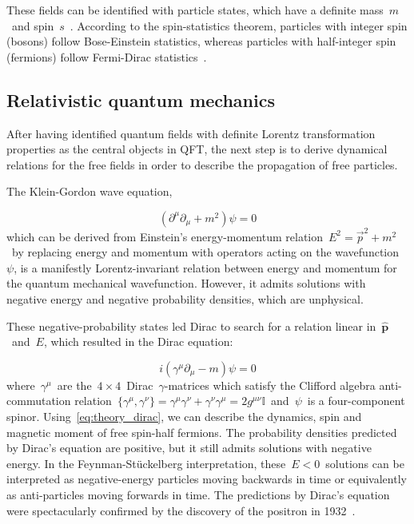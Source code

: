 These fields can be identified with particle states, which have a definite mass~$m$~and spin~$s$~\cite{wigner1939unitary}. According to the spin-statistics theorem, particles with integer spin (bosons) follow Bose-Einstein statistics, whereas particles with half-integer spin (fermions) follow Fermi-Dirac statistics~\cite{pauli1940connection}. 

\subsection{Relativistic quantum mechanics}
After having identified quantum fields with definite Lorentz transformation properties as the central objects in QFT, the next step is to derive dynamical relations for the free fields in order to describe the propagation of free particles.

The Klein-Gordon wave equation,

\begin{equation}
\label{eq:theory_klein_gordon}
(\partial^\mu \partial_\mu + m^2) \psi = 0
\end{equation}
which can be derived from Einstein's energy-momentum relation~$E^2 = \vec{p}^2 + m^2$~by replacing energy and momentum with operators acting on the wavefunction~$\psi$, is a manifestly Lorentz-invariant relation between energy and momentum for the quantum mechanical wavefunction. However, it admits solutions with negative energy and negative probability densities, which are unphysical.

These negative-probability states led Dirac to search for a relation linear in~$\hat{\mathbf{p}}$~and~$E$, which resulted in the Dirac equation:

\begin{equation}
\label{eq:theory_dirac}
i (\gamma^\mu \partial_\mu - m) \psi = 0
\end{equation}
where~$\gamma^\mu$~are the~$4\times4$~Dirac~$\gamma$-matrices which satisfy the Clifford algebra anti-commutation relation~$\{ \gamma^\mu, \gamma^\nu \} = \gamma^\mu \gamma^\nu + \gamma^\nu \gamma^\mu = 2 g^{\mu\nu} \mathbb{I}$~and~$\psi$~is a four-component spinor. Using~\cref{eq:theory_dirac}, we can describe the dynamics, spin and magnetic moment of free spin-half fermions. The probability densities predicted by Dirac's equation are positive, but it still admits solutions with negative energy. In the Feynman-Stückelberg interpretation, these~$E<0$~solutions can be interpreted as negative-energy particles moving backwards in time or equivalently as anti-particles moving forwards in time. The predictions by Dirac's equation were spectacularly confirmed by the discovery of the positron in 1932~\cite{anderson1933positive}.

